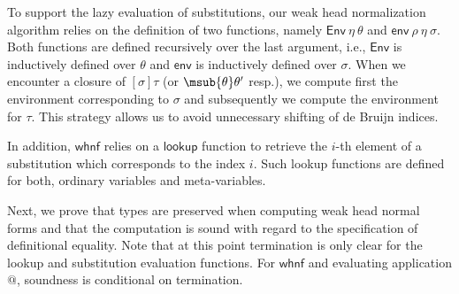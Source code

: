 \documentclass[copyright,creativecommons]{eptcs}
\newcommand{\tlookup}{\mathsf{lookup}}
\newcommand{\twhnf}{\mathsf{whnf}}
\newcommand{\twsub}{\mathsf{env}}
\newcommand{\wsub}[3]{\twsub~#1~#2~#3}
\newcommand{\twmsub}{\mathsf{Env}}
\newcommand{\wmsub}[2]{\twmsub~#1~#2}
\begin{document}
To support the lazy evaluation of substitutions, our weak head
normalization algorithm relies on the definition of two functions,
namely $\wmsub \eta \theta$ and $\wsub \rho \eta \sigma$. Both
functions are defined recursively over the last argument, i.e., $\twmsub$
is inductively defined over $\theta$ and $\twsub$ 
{is} inductively defined over $\sigma$. When we encounter a closure of $[\sigma]\tau$
(or $\msub{\theta}\theta'$ resp.), we compute first the environment
corresponding to $\sigma$ and subsequently we compute the environment
for $\tau$. This strategy allows us to avoid unnecessary shifting of
de Bruijn indices. 

In addition, $\twhnf$ relies on a $\tlookup$ function to retrieve the $i$-th
element of a substitution which corresponds to the index $i$. Such
lookup functions are defined for both, ordinary variables and
meta-variables. 

Next, we prove that types are preserved when computing weak head
normal forms and that the computation is sound with regard to the
specification of definitional equality.  Note that at this point
termination is only clear for the lookup and substitution evaluation
functions.  For $\twhnf$ and evaluating application $@$, soundness is
conditional on termination. 
\end{document}
